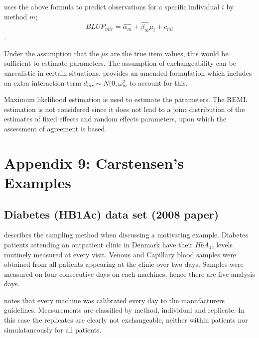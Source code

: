 \documentclass[12pt, a4paper]{report}
\theoremstyle{plain}
\theoremstyle{definition}
\theoremstyle{remark}
\begin{document}

\citet{BXC2004} uses the above formula to predict observations for a specific individual $i$ by method $m$;
\begin{equation}BLUP_{mir} = \hat{\alpha_{m}} + \hat{\beta_{m}}\mu_{i} +
c_{mi} 
\end{equation}. 

Under the assumption that the $\mu$s are the true item values, this would be sufficient to estimate parameters. The assumption of exchangeability can be unrealistic in certain situations.
\citet{BXC2004} provides an amended formulation which includes an extra interaction
term $d_{mr} \sim N(0,\omega^{2}_{m}$ to account for this.



Maximum likelihood estimation is used to estimate the parameters.
The REML estimation is not considered since it does not lead to a
joint distribution of the estimates of fixed effects and random
effects parameters, upon which the assessment of agreement is
based.







\section{Appendix 9: Carstensen's Examples}
\subsection{Diabetes (HB1Ac) data set (2008 paper)}
\citet{BXC2008} describes the sampling method when discussing a motivating example. Diabetes patients attending an outpatient clinic in Denmark have their $HbA_{1c}$ levels routinely measured at every visit. Venous and Capillary blood samples were obtained from all patients appearing at the clinic over two days. Samples were measured on four consecutive days on each machines, hence there are five analysis days.

\citet{BXC2008} notes that every machine was calibrated every day to the manufacturers guidelines. Measurements are classified by method, individual and replicate. In this case the replicates are clearly not exchangeable, neither within patients nor simulataneously for all patients.
\end{document}
